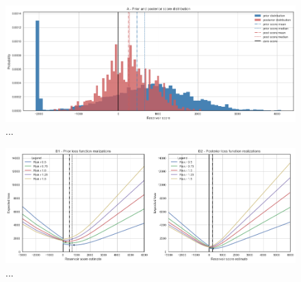 	\begin{figure}[h]
			\centering
			\includegraphics[width=1\textwidth]{Figures/update_smallres2.png}
			\caption{...}\label{fig:update_smallres2} 
	\end{figure}
	
	\begin{figure}[h]
				\centering
				\includegraphics[width=1\textwidth]{Figures/update_smallres3.png}
				\caption{...}\label{fig:update_smallres3} 
	\end{figure}
			
	
